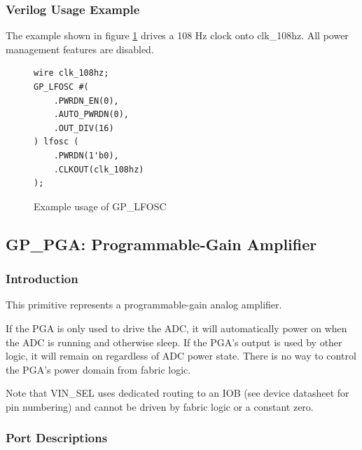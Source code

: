 \documentclass{article}
\begin{document}
\pagebreak
\subsubsection{Verilog Usage Example}

The example shown in figure \ref{gp-lfosc-example} drives a 108 Hz clock onto clk\_108hz. All power management features 
are disabled.

\begin{figure}[h]
\begin{lstlisting}
wire clk_108hz;
GP_LFOSC #(
	.PWRDN_EN(0),
	.AUTO_PWRDN(0),
	.OUT_DIV(16)
) lfosc (
	.PWRDN(1'b0),
	.CLKOUT(clk_108hz)
);
\end{lstlisting}
\caption{Example usage of GP\_LFOSC}
\label{gp-lfosc-example}
\end{figure}


\pagebreak
\clearpage
\subsection{GP\_PGA: Programmable-Gain Amplifier}

\subsubsection{Introduction}
This primitive represents a programmable-gain analog amplifier.

If the PGA is only used to drive the ADC, it will automatically power on when the ADC is running and otherwise sleep. 
If the PGA's output is used by other logic, it will remain on regardless of ADC power state. There is no way to control 
the PGA's power domain from fabric logic.

Note that VIN\_SEL uses dedicated routing to an IOB (see device datasheet for pin numbering) and cannot be driven 
by fabric logic or a constant zero.

\subsubsection{Port Descriptions}
\end{document}
